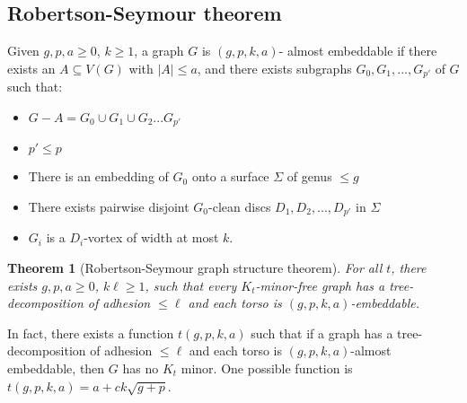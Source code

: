 \documentclass[]{article}
\newtheorem{theorem}{Theorem}
\theoremstyle{definition}
\numberwithin{theorem}{section}
\numberwithin{equation}{section}
\begin{document}
\subsection{Robertson-Seymour theorem}
Given $g, p, a \geq 0$, $k \geq 1$, a graph $G$ is $(g, p, k, a)$- almost embeddable if there exists an $A \subseteq V(G)$ with $|A| \leq a$, and there exists subgraphs $G_0, G_1, ...,  G_{p'}$ of $G$ such that:
\begin{itemize}
	\item $G - A = G_0 \cup G_1 \cup G_2 ... G_{p'}$
	\item $p' \leq p$
	\item There is an embedding of $G_0$ onto a surface $\Sigma$ of genus $\leq g$
	\item There exists pairwise disjoint $G_0$-clean discs $D_1, D_2, ..., D_{p'}$ in $\Sigma$
	\item $G_i$ is a $D_i$-vortex of width at most $k$.
\end{itemize}

\begin{theorem}[Robertson-Seymour graph structure theorem]
	For all $t$, there exists $g, p, a \geq 0$, $k \ell \geq 1$, such that every $K_t$-minor-free graph has a tree-decomposition of adhesion $\leq \ell$ and each torso is $(g, p, k, a)$-embeddable. 
\end{theorem}
In fact, there exists a function $t(g, p, k, a)$ such that if a graph has a tree-decomposition of adhesion $\leq \ell$ and each torso is $(g, p, k, a)$-almost embeddable, then $G$ has no $K_t$ minor. One possible function is $t(g, p, k, a) = a + ck \sqrt{g + p}$. 
\end{document}
